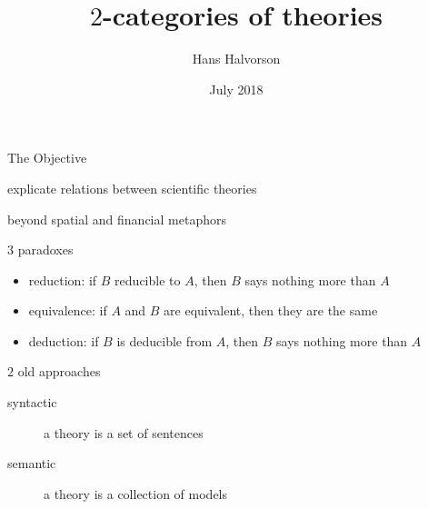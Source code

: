 \documentclass[17pt]{beamer}
\title{$2$-categories of theories}
\author{Hans Halvorson}
\date{July 2018}
\begin{document}
\def\2{\mathcal}
\def\7{\mathfrak}

\begin{frame}

\maketitle  

\end{frame}

\begin{frame}{The Objective}

  explicate relations between scientific theories

    

\bigskip beyond spatial and financial metaphors



\end{frame}

\begin{frame}{\small $3$ paradoxes}

  \begin{itemize}
  \item reduction: if $B$ reducible to $A$, then $B$ says nothing more
    than $A$
  \item equivalence: if $A$ and $B$ are equivalent, then they are the same
  \item deduction: if $B$ is deducible from $A$, then $B$ says nothing more than $A$
  \end{itemize}  

\end{frame}  




\begin{frame}{\small $2$ old approaches}

 \begin{description}
 \item[syntactic] a theory is a set of sentences
 \item[semantic] a theory is a collection of models
  \end{description}

\end{frame}  
\end{document}
